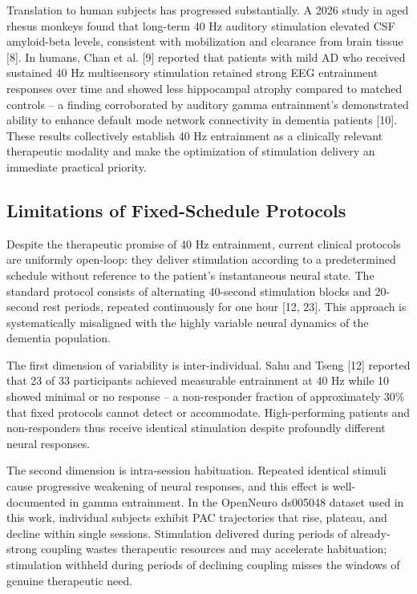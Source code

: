 \documentclass[11pt,letterpaper]{article}
\begin{document}
Translation to human subjects has progressed substantially. A 2026 study in aged rhesus monkeys found that long-term 40 Hz auditory stimulation elevated CSF amyloid-beta levels, consistent with mobilization and clearance from brain tissue [8]. In humans, Chan et al. [9] reported that patients with mild AD who received sustained 40 Hz multisensory stimulation retained strong EEG entrainment responses over time and showed less hippocampal atrophy compared to matched controls -- a finding corroborated by auditory gamma entrainment's demonstrated ability to enhance default mode network connectivity in dementia patients [10]. These results collectively establish 40 Hz entrainment as a clinically relevant therapeutic modality and make the optimization of stimulation delivery an immediate practical priority.

\subsection{Limitations of Fixed-Schedule Protocols}

Despite the therapeutic promise of 40 Hz entrainment, current clinical protocols are uniformly open-loop: they deliver stimulation according to a predetermined schedule without reference to the patient's instantaneous neural state. The standard protocol consists of alternating 40-second stimulation blocks and 20-second rest periods, repeated continuously for one hour [12, 23]. This approach is systematically misaligned with the highly variable neural dynamics of the dementia population.

The first dimension of variability is inter-individual. Sahu and Tseng [12] reported that 23 of 33 participants achieved measurable entrainment at 40 Hz while 10 showed minimal or no response -- a non-responder fraction of approximately 30\% that fixed protocols cannot detect or accommodate. High-performing patients and non-responders thus receive identical stimulation despite profoundly different neural responses.

The second dimension is intra-session habituation. Repeated identical stimuli cause progressive weakening of neural responses, and this effect is well-documented in gamma entrainment. In the OpenNeuro ds005048 dataset used in this work, individual subjects exhibit PAC trajectories that rise, plateau, and decline within single sessions. Stimulation delivered during periods of already-strong coupling wastes therapeutic resources and may accelerate habituation; stimulation withheld during periods of declining coupling misses the windows of genuine therapeutic need.
\end{document}
